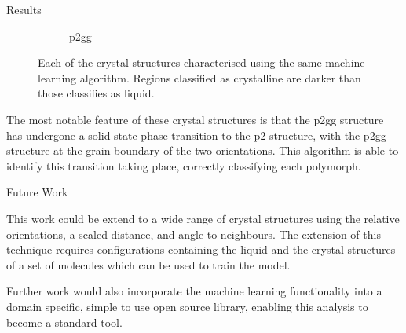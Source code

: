 \documentclass{beamer}
\begin{document}
\begin{frame}[t]{}
\begin{columns}[t]
\begin{column}{0.47\linewidth}
\begin{block}{Results}
\begin{figure}[h]
\begin{subfigure}[t]{\linewidth}
            \caption{p2gg}
            \label{fig:categorised p2gg}
          \end{subfigure}
          \caption{Each of the crystal structures characterised using the same
            machine learning algorithm. Regions classified as crystalline are darker
            than those classifies as liquid.}
          \label{fig:categorised}
        \end{figure}

        The most notable feature of these crystal structures is that the p2gg structure
        has undergone a solid-state phase transition to the p2 structure, with the p2gg
        structure at the grain boundary of the two orientations. This algorithm is able
        to identify this transition taking place, correctly classifying each polymorph.

      \end{block}

      \begin{block}{Future Work}

        This work could be extend to a wide range of crystal structures using the
        relative orientations, a scaled distance, and angle to neighbours. The extension
        of this technique requires configurations containing the liquid and the crystal
        structures of a set of molecules which can be used to train the model.

        Further work would also incorporate the machine learning functionality into a
        domain specific, simple to use open source library, enabling this analysis
        to become a standard tool.

        \vspace{0.62em}

      \end{block}

    \end{column}
  \end{columns}
\end{frame}
\end{document}
